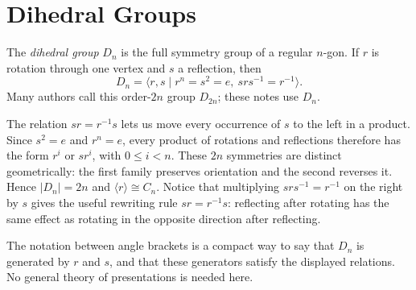 \section{Dihedral Groups}

\begin{definition}
The \emph{dihedral group} \(D_n\) is the full symmetry group of a regular
\(n\)-gon.  If \(r\) is rotation through one vertex and \(s\) a reflection,
then
\[D_n=\langle r,s\mid r^n=s^2=e,\ srs^{-1}=r^{-1}\rangle.\]
Many authors call this order-\(2n\) group \(D_{2n}\); these notes use \(D_n\).
\end{definition}

The relation \(sr=r^{-1}s\) lets us move every occurrence of \(s\) to the
left in a product. Since \(s^2=e\) and \(r^n=e\), every product of rotations
and reflections therefore has the form \(r^i\) or \(sr^i\), with
\(0\leq i<n\).  These \(2n\) symmetries are distinct geometrically: the first
family preserves orientation and the second reverses it.  Hence
\(|D_n|=2n\) and \(\langle r\rangle\cong C_n\).  Notice that multiplying
\(srs^{-1}=r^{-1}\) on the right by \(s\) gives the useful rewriting rule
\(sr=r^{-1}s\): reflecting after rotating has the same effect as rotating in
the opposite direction after reflecting.

The notation between angle brackets is a compact way to say that \(D_n\) is
generated by \(r\) and \(s\), and that these generators satisfy the displayed
relations. No general theory of presentations is needed here.

